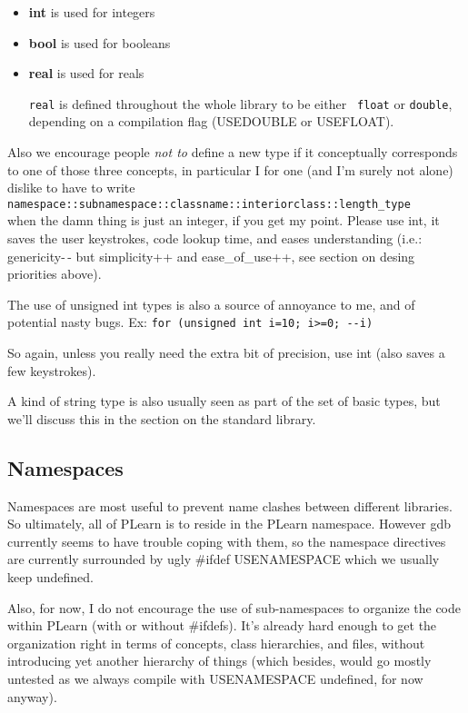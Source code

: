 \documentclass[11pt]{book}
\begin{document}
\begin{itemize}
\item \textbf{int} is used for integers
\item \textbf{bool} is used for booleans
\item \textbf{real} is used for reals

{\tt real} is defined throughout the whole library to be either {\tt
float} or {\tt double}, depending on a compilation flag (USEDOUBLE
or USEFLOAT).
\end{itemize}

 Also we encourage people \emph{not to} define a new type if it
conceptually corresponds to one of those three concepts, in particular
I for one (and I'm surely not alone) dislike to have to write\\
\texttt{namespace::subnamespace::classname::interiorclass::length\_type}\\
when the damn thing is just an integer, if you get my point. Please
use int, it saves the user keystrokes, code lookup time, and
eases understanding (i.e.: genericity-\,- but simplicity++ and
ease\_of\_use++, see section on desing priorities above).

 The use of unsigned int types is also a source of annoyance to me,
and of potential nasty bugs. Ex:
\verb!for (unsigned int i=10; i>=0; --i)!

So again, unless you really need the extra bit of precision,
use int (also saves a few keystrokes).

 A kind of string type is also usually seen as part of the set of basic
types, but we'll discuss this in the section on the standard library.

\subsection*{Namespaces}
 Namespaces are most useful to prevent name clashes between different
libraries. So ultimately, all of PLearn is to reside in the PLearn
namespace. However gdb currently seems to have trouble coping with
them, so the namespace directives are currently surrounded by ugly
\#ifdef USENAMESPACE which we usually keep undefined.

 Also, for now, I do not encourage the use of sub-namespaces to
organize the code within PLearn (with or without \#ifdefs). It's
already hard enough to get the organization right in terms of
concepts, class hierarchies, and files, without introducing yet
another hierarchy of things (which besides, would go mostly untested
as we always compile with USENAMESPACE undefined, for now anyway).
\end{document}
